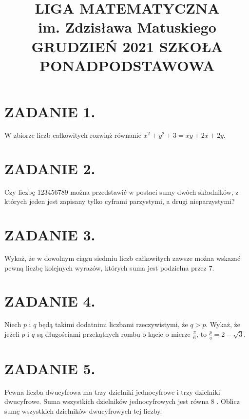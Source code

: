 \documentclass[10pt]{article}
\title{LIGA MATEMATYCZNA \\
 im. Zdzisława Matuskiego GRUDZIEŃ 2021 SZKOŁA PONADPODSTAWOWA }
\author{}
\date{}
\begin{document}
\maketitle
\section*{ZADANIE 1.}
W zbiorze liczb całkowitych rozwiąż równanie \(x^{2}+y^{2}+3=x y+2 x+2 y\).

\section*{ZADANIE 2.}
Czy liczbę 123456789 można przedstawić w postaci sumy dwóch składników, z których jeden jest zapisany tylko cyframi parzystymi, a drugi nieparzystymi?

\section*{ZADANIE 3.}
Wykaż, że w dowolnym ciągu siedmiu liczb całkowitych zawsze moźna wskazać pewną liczbę kolejnych wyrazów, których suma jest podzielna przez 7.

\section*{ZADANIE 4.}
Niech \(p\) i \(q\) będą takimi dodatnimi liczbami rzeczywistymi, że \(q>p\). Wykaż, że jeżeli \(p\) i \(q\) są długościami przekątnych rombu o kącie o mierze \(\frac{\pi}{6}\), to \(\frac{p}{q}=2-\sqrt{3}\).

\section*{ZADANIE 5.}
Pewna liczba dwucyfrowa ma trzy dzielniki jednocyfrowe i trzy dzielniki dwucyfrowe. Suma wszystkich dzielników jednocyfrowych jest równa 8 . Oblicz sumę wszystkich dzielników dwucyfrowych tej liczby.
\end{document}
